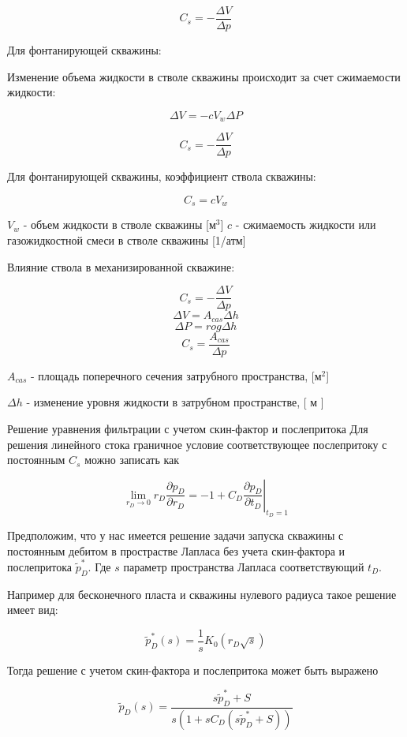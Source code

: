 $$ C_s = - \frac{ \Delta V}{ \Delta p} $$

Для фонтанирующей скважины:

Изменение объема жидкости в стволе скважины происходит за счет сжимаемости жидкости:

$$ \Delta V = -c{V_w}{\Delta P} $$

$$ C_s = - \frac{ \Delta V}{ \Delta p} $$

Для фонтанирующей скважины, коэффициент ствола скважины:

$$ C_s =  c {V_w} $$

$ V_w $ - объем жидкости в стволе скважины  [м$^3$]
$c$ - сжимаемость жидкости или газожидкостной смеси в стволе скважины [1/атм]


Влияние ствола в механизированной скважине:

$$ C_s = - \frac{ \Delta V}{ \Delta p} $$
$$ {\Delta V} = A_{cas}{\Delta h} $$
$$ {\Delta P} ={ro g}{\Delta h}$$
$$ C_s =  \frac{ A_{cas}}{ \Delta p} $$

$ A_{cas}$ - площадь поперечного сечения затрубного пространства, [м$^2$]


$ {\Delta h}$ - изменение уровня жидкости в затрубном пространстве, [ м ]

Решение уравнения фильтрации с учетом скин-фактор и послепритока
Для решения линейного стока граничное условие соответствующее послепритоку с постоянным $C_s$ можно записать как

$$ \lim_{r_D \to 0} {r_D \frac{\partial p_D}{\partial r_D}} = -1 + \left. C_D \frac{\partial p_D}{\partial t_D} \right|_{t_D=1}$$

Предположим, что у нас имеется решение задачи запуска скважины с постоянным дебитом в прострастве Лапласа без учета скин-фактора и послепритока $\tilde{p}_D^{*}$. Где $s$ параметр пространства Лапласа соответствующий $t_D$.

Например для бесконечного пласта и скважины нулевого радиуса такое решение имеет вид: 

$$\tilde{p}_D^*(s) = \frac{1}{s} K_0 \left( r_D \sqrt s  \right) $$

Тогда решение с учетом скин-фактора и послепритока может быть выражено 

$$\tilde{p}_D(s) = \frac{s \tilde{p}_D^* + S}{s \left( 1+s C_D \left( s \tilde{p}_D^* + S \right)  \right)}   $$



